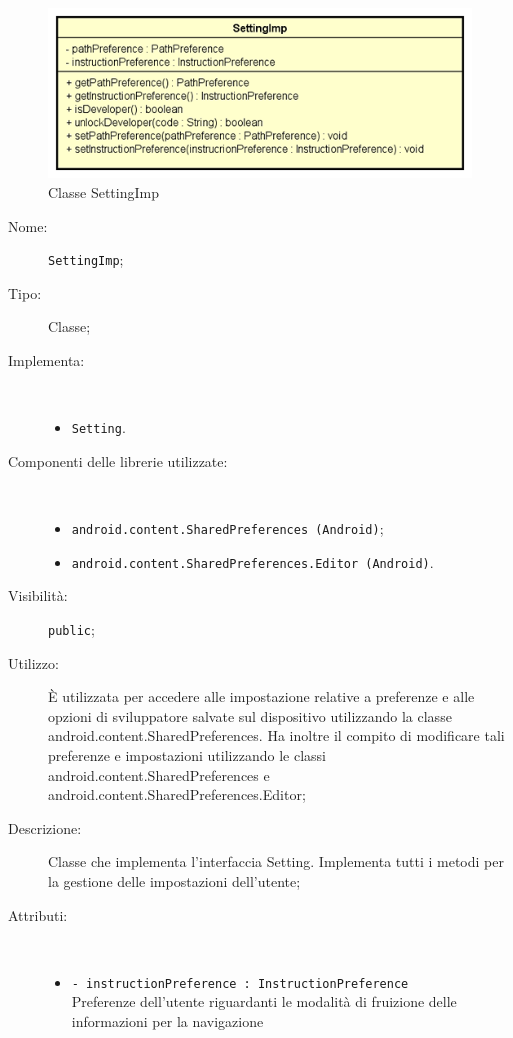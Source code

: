 \documentclass[../DefinizioneDiProdotto.tex]{subfiles}
\begin{document}
    \begin{figure}[H]
        \centering
        \includegraphics{img/SettingImp.png}
        \caption{Classe SettingImp}\label{fig:model::usersetting::SettingImp} 
    \end{figure}
    \begin{description}
\item[Nome:] \texttt{SettingImp};
\item[Tipo:] Classe;
\item[Implementa:] \
\begin{itemize}
\item \texttt{Setting}.

\end{itemize}
\item[Componenti delle librerie utilizzate:] \
\begin{itemize}
\item \texttt{android.content.SharedPreferences (Android)};

\item \texttt{android.content.SharedPreferences.Editor (Android)}.

\end{itemize}
\item[Visibilità:] \texttt{public};
\item[Utilizzo:] È utilizzata per accedere alle impostazione relative a preferenze e alle opzioni di sviluppatore salvate sul dispositivo utilizzando la classe android.content.SharedPreferences. Ha inoltre il compito di modificare tali preferenze e impostazioni utilizzando le classi android.content.SharedPreferences e android.content.SharedPreferences.Editor;
\item[Descrizione:] Classe che implementa l'interfaccia Setting. Implementa tutti i metodi per la gestione delle impostazioni dell'utente;
\item[Attributi:] \
\begin{itemize}
\item \texttt{- instructionPreference : InstructionPreference}\\
Preferenze dell'utente riguardanti le modalità di fruizione delle informazioni per la navigazione


\end{itemize}
\end{description}
\end{document}
